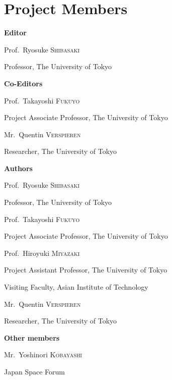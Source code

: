 \chapter*{Project Members}

\begin{center}

{\large \bfseries Editor\par}

\vspace{0.3 cm}

{Prof.~Ryosuke \textsc{Shibasaki}\par}
{\footnotesize Professor, The University of Tokyo\par}

\vspace{0.8 cm}

{\large \bfseries Co-Editors\par}

\vspace{0.3 cm}

{Prof.~Takayoshi \textsc{Fukuyo}\par}
{\footnotesize Project Associate Professor, The University of Tokyo\par}
\vspace{0.2 cm}
{Mr.~Quentin \textsc{Verspieren}\par}
{\footnotesize Researcher, The University of Tokyo\par}

\vspace{0.8 cm}

{\large \bfseries Authors\par}

\vspace{0.3 cm}

{Prof.~Ryosuke \textsc{Shibasaki}\par}
{\footnotesize Professor, The University of Tokyo\par}
\vspace{0.2 cm}
{Prof.~Takayoshi \textsc{Fukuyo}\par}
{\footnotesize Project Associate Professor, The University of Tokyo\par}
\vspace{0.2 cm}
{Prof.~Hiroyuki \textsc{Miyazaki}\par}
{\footnotesize Project Assistant Professor, The University of Tokyo\par}
{\footnotesize Visiting Faculty, Asian Institute of Technology\par}
\vspace{0.2 cm}
{Mr.~Quentin \textsc{Verspieren}\par}
{\footnotesize Researcher, The University of Tokyo\par}

\vspace{0.8 cm}

{\large \bfseries Other members\par}

\vspace{0.3 cm}

{Mr.~Yoshinori \textsc{Kobayashi}\par}
{\footnotesize Japan Space Forum\par}

\end{center}